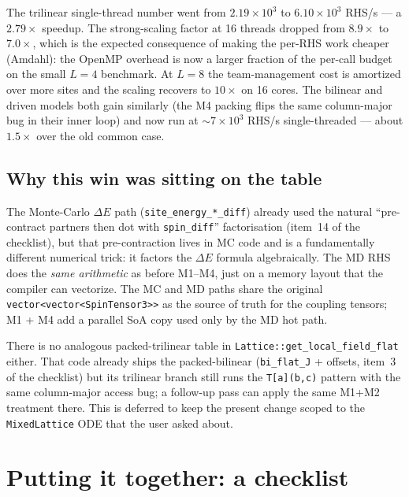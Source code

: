 \documentclass[11pt,letterpaper]{article}
\begin{document}
The trilinear single-thread number went from $2.19 \times 10^{3}$ to
$6.10 \times 10^{3}$ RHS/s --- a $\mathbf{2.79\times}$ speedup.  The
strong-scaling factor at 16 threads dropped from $8.9\times$ to
$7.0\times$, which is the expected consequence of making the per-RHS
work cheaper (Amdahl): the OpenMP overhead is now a larger fraction
of the per-call budget on the small $L=4$ benchmark.  At $L=8$ the
team-management cost is amortized over more sites and the scaling
recovers to $10\times$ on 16 cores.  The bilinear and driven models
both gain similarly (the M4 packing flips the same column-major bug
in their inner loop) and now run at $\sim 7 \times 10^{3}$ RHS/s
single-threaded --- about $1.5\times$ over the old common case.

\subsection{Why this win was sitting on the table}

The Monte-Carlo $\Delta E$ path (\texttt{site\_energy\_*\_diff})
already used the natural ``pre-contract partners then dot with
\texttt{spin\_diff}'' factorisation (item~14 of the checklist), but
that pre-contraction lives in MC code and is a fundamentally
different numerical trick: it factors the $\Delta E$ formula
algebraically.  The MD RHS does the \emph{same arithmetic} as before
M1--M4, just on a memory layout that the compiler can vectorize.
The MC and MD paths share the original
\texttt{vector<vector<SpinTensor3>>} as the source of truth for the
coupling tensors; M1 + M4 add a parallel SoA copy used only by the
MD hot path.

There is no analogous packed-trilinear table in
\texttt{Lattice::get\_local\_field\_flat} either.  That code already
ships the packed-bilinear (\texttt{bi\_flat\_J} + offsets, item~3 of
the checklist) but its trilinear branch still runs the
\texttt{T[a](b,c)} pattern with the same column-major access bug; a
follow-up pass can apply the same M1+M2 treatment there.  This is
deferred to keep the present change scoped to the
\texttt{MixedLattice} ODE that the user asked about.

\section{Putting it together: a checklist}
\end{document}
